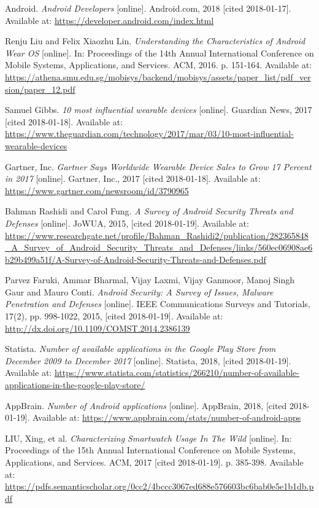 \begin{thebibliography}{10}
Android. \textit{Android Developers} [online]. Android.com, 2018 [cited 2018-01-17]. Available at: \url{https://developer.android.com/index.html}

Renju Liu and Felix Xiaozhu Lin. \textit{Understanding the Characteristics of Android Wear OS} [online]. In: Proceedings of the 14th Annual International Conference on Mobile Systems, Applications, and Services. ACM, 2016. p. 151-164. Available at: \url{https://athena.smu.edu.sg/mobisys/backend/mobisys/assets/paper_list/pdf_version/paper_12.pdf}

Samuel Gibbs. \textit{10 most influential wearable devices} [online]. Guardian News, 2017 [cited 2018-01-18]. Available at: \url{https://www.theguardian.com/technology/2017/mar/03/10-most-influential-wearable-devices}

Gartner, Inc. \textit{Gartner Says Worldwide Wearable Device Sales to Grow 17 Percent in 2017} [online]. Gartner, Inc., 2017 [cited 2018-01-18]. Available at: \url{https://www.gartner.com/newsroom/id/3790965}

Bahman Rashidi and Carol Fung. \textit{A Survey of Android Security Threats and Defenses} [online]. JoWUA, 2015, [cited 2018-01-19]. Available at: \url{https://www.researchgate.net/profile/Bahman_Rashidi2/publication/282365848_A_Survey_of_Android_Security_Threats_and_Defenses/links/560ec06908ae6b29b499a51f/A-Survey-of-Android-Security-Threats-and-Defenses.pdf}

Parvez Faruki, Ammar Bharmal, Vijay Laxmi, Vijay Ganmoor, Manoj Singh Gaur and Mauro Conti. \textit{Android Security: A Survey of Issues, Malware Penetration and Defenses} [online]. IEEE Communications Surveys and Tutorials, 17(2), pp. 998-1022, 2015, [cited 2018-01-19]. Available at: \url{http://dx.doi.org/10.1109/COMST.2014.2386139}

Statista. \textit{Number of available applications in the Google Play Store from December 2009 to December 2017} [online]. Statista, 2018, [cited 2018-01-19]. Available at: \url{https://www.statista.com/statistics/266210/number-of-available-applications-in-the-google-play-store/}

AppBrain. \textit{Number of Android applications} [online]. AppBrain, 2018, [cited 2018-01-19]. Available at: \url{https://www.appbrain.com/stats/number-of-android-apps}

LIU, Xing, et al. \textit{Characterizing Smartwatch Usage In The Wild} [online]. In: Proceedings of the 15th Annual International Conference on Mobile Systems, Applications, and Services. ACM, 2017 [cited 2018-01-19]. p. 385-398. Available at: \url{https://pdfs.semanticscholar.org/0cc2/4bccc3067ed688e576603bc6bab0e5e1b1db.pdf}


\end{thebibliography}
